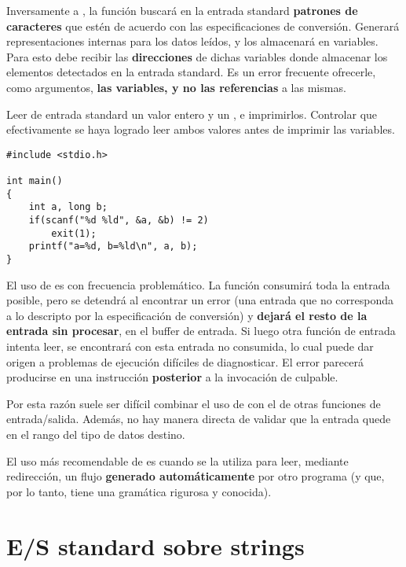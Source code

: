 Inversamente a , la función  buscará en la entrada standard
\textbf{patrones de caracteres} que estén de acuerdo con las especificaciones de conversión. Generará
representaciones internas para los datos leídos, y los almacenará en variables.
Para esto debe recibir las \textbf{direcciones} de dichas variables donde almacenar los
elementos detectados en la entrada standard. Es un error frecuente ofrecerle,
como argumentos, \textbf{las variables, y no las referencias} a las mismas.


\begin{ejemplo}
Leer de entrada standard un valor entero y un , e imprimirlos. Controlar que efectivamente se haya logrado leer ambos valores antes de imprimir las variables.
\begin{lstlisting}
#include <stdio.h>

int main() 
{
    int a, long b;
    if(scanf("%d %ld", &a, &b) != 2)
        exit(1);
    printf("a=%d, b=%ld\n", a, b);
}
\end{lstlisting}
\end{ejemplo}


El uso de  es con frecuencia problemático. La función  consumirá
toda la entrada posible, pero se detendrá al encontrar un error (una entrada
que no corresponda a lo descripto por la especificación de conversión) y \textbf{dejará
el resto de la entrada sin procesar}, en el buffer de entrada. Si luego otra
función de entrada intenta leer, se encontrará con esta entrada no consumida,
lo cual puede dar origen a problemas de ejecución difíciles de diagnosticar. El
error parecerá producirse en una instrucción \textbf{posterior} a la invocación de  culpable. 

Por esta razón suele ser difícil combinar el uso de  con el de 
otras funciones de entrada/salida. Además, no hay manera directa de validar que
la entrada quede en el rango del tipo de datos destino.

El uso más recomendable de  es cuando se la utiliza para leer, mediante
redirección, un flujo \textbf{generado automáticamente} por otro programa (y que, por lo
tanto, tiene una gramática rigurosa y conocida).

\section{E/S standard sobre strings}
\label{subsec:esstandardstrings}

